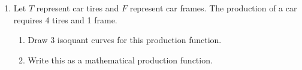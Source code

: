 \documentclass[11pt]{article}
\newcommand{\answer}[1]{\iftoggle{INCLUDEANSWERS}{{\color{violet!70!white}\textbf{Solution:} #1}}{}}
\begin{document}
\begin{enumerate}
  \item Let $T$ represent car tires and $F$ represent car frames. The production of a car requires 4 tires and 1 frame. 
  \begin{enumerate}
    \item Draw 3 isoquant curves for this production function.
    
    \item Write this as a mathematical production function.
  \end{enumerate}

  \answer{
    \begin{enumerate}
      \item A bunch of "brackets" along the line $4F = T$.
      
      \item $Q(F, T) = \min\{ 4F, T \}$
    \end{enumerate}
  }
\end{enumerate}
\end{document}
